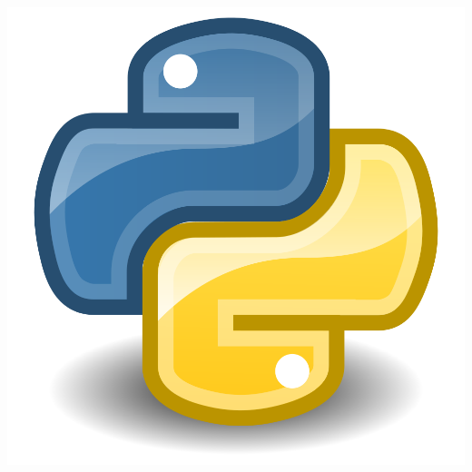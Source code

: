 \documentclass[17pt,hyperref={pdfpagelabels=false}]{beamer}
\newlength{\onecolumnwidth}
\begin{document}
\begin{frame}[t]
\begin{columns}[t,onlytextwidth=\textwidth]
\begin{column}{0.99\paperwidth}
\begin{columns}[t,onlytextwidth=\textwidth]
\begin{column}[t,onlytextwidth=\textwidth]{\onecolumnwidth}
            \includegraphics[scale=0.2]{python.png}
        \end{column}
        \end{columns}
    \end{column}
\end{columns}
\end{frame}
\end{document}
